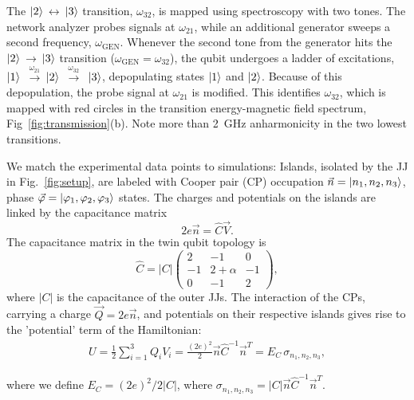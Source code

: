 \documentclass[%
reprint,
superscriptaddress,
bibnotes,
amsmath,
amssymb,
aps,
showkeys,
prb,
]{revtex4-2}
\newcommand{\iket}[1]{\ensuremath{\Ket{#1}}}
\newcommand{\ira}{\ensuremath{\,\rightarrow\,}}
\newcommand{\ilra}{\ensuremath{\,\leftrightarrow\,}}
\newcommand{\iabs}[1]{\ensuremath{\left|#1\right|}}
\newcommand{\iratext}[1]{\ensuremath{\,\xrightarrow{\text{#1}}\,}}
\begin{document}
The  \iket{2}\ilra\iket{3}  transition,  $\omega_{32}$,   is  mapped  using
spectroscopy with two tones. The network  analyzer probes  signals at  $ \omega_{21}  $, while  an
additional generator  sweeps a second  frequency, $ \omega_{\text{GEN}}  $.  Whenever
the second tone from the generator hits the \iket{2}\ira\iket{3} transition
($\omega_{\text{GEN}}  = \omega_{32}  $), the  qubit  undergoes a  ladder of  excitations,
\iket{1}  \iratext{$\omega_{21}$}\iket{2}  \iratext{$\omega_{32}$} \iket{3},  depopulating
states \iket{1} and \iket{2}.  Because of this depopulation, the probe signal at $\omega_{21}$ is
modified.
This identifies  $\omega_{32}$, which  is mapped  with red  circles in  the transition
energy-magnetic field spectrum, Fig~\ref{fig:transmission}(b). Note more than 2~GHz anharmonicity in the two lowest transitions.  

We match the  experimental data points to simulations: Islands,  isolated by the
JJ  in  Fig.~\ref{fig:setup},  are  labeled with  Cooper  pair  (CP)  occupation
$       \vec{n}      =       \iket{n_1,      n_2,       n_3}      $,       phase
$     \vec{\varphi}     =     \iket{\varphi_1,     \varphi_2,     \varphi_3}     $  states.  The charges and potentials on
the islands are linked by the capacitance matrix
\begin{equation}
  \label{eq:link}
  2e\vec{n} = \hat{C}\vec{V}.
\end{equation}
The capacitance matrix in the twin qubit topology is
\begin{equation}
  \hat{C} = \iabs{C} \begin{pmatrix}
    2  &  -1  &  0\\
    -1  &  2  +  \alpha  &  -1\\
    0  &  -1  & 2
  \end{pmatrix},
  \label{eq:capac}
\end{equation}
where \iabs{C}  is the capacitance of the outer  JJs.  The interaction
of the  CPs, carrying a  charge $ \vec{Q}=2e\vec{n}  $, and potentials  on their
respective islands gives rise to the 'potential' term of the Hamiltonian:
\begin{equation}\label{eq:potential}
  \begin{aligned}
    U = \frac{1}{2}\sum_{i=1}^{3}Q_iV_i =
    \frac{(2e)^2}{2}\vec{n}\hat{C}^{-1}\vec{n}^{T} = E_C\,\sigma_{n_1, n_2, n_3},
  \end{aligned}
\end{equation}

\noindent where we define $ E_{C}={(2e)^{2}}/{2 \iabs{C} } $, where $\sigma_{n_1, n_2, n_3} = \iabs{C}\vec{n}\hat{C}^{-1}\vec{n}^{T}$.
\end{document}
